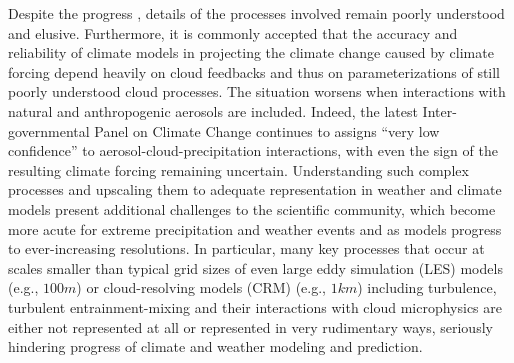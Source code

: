 \documentclass[draft,linenumbers]{agujournal}
\begin{document}
Despite the progress \citep[see][for recent reviews]{Devenish2012, GrabowskiWang2013}, details of the processes involved remain poorly understood and elusive. Furthermore, it is commonly accepted that the accuracy and reliability of climate models in projecting the climate change caused by climate forcing depend heavily on cloud feedbacks and thus on parameterizations of still poorly understood cloud processes. The situation worsens when interactions with natural and anthropogenic aerosols are included. Indeed, the latest Inter-governmental Panel on Climate Change continues to assigns ``very low confidence'' to aerosol-cloud-precipitation interactions, with even the sign of the resulting climate forcing remaining uncertain. Understanding such complex processes and upscaling them to adequate representation in weather and climate models present additional challenges to the scientific community, which become more acute for extreme precipitation and weather events and as models progress to ever-increasing resolutions. In particular, many key processes that occur at scales smaller than typical grid sizes of even large eddy simulation (LES) models (e.g., $100m$) or cloud-resolving models (CRM) (e.g., $1km$) including turbulence, turbulent entrainment-mixing and their interactions with cloud microphysics are either not represented at all or represented in very rudimentary ways, seriously hindering progress of climate and weather modeling and prediction.
\end{document}
